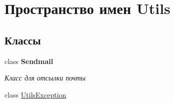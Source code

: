 \hypertarget{namespace_utils}{}\section{Пространство имен Utils}
\label{namespace_utils}
\subsection*{Классы}
\begin{DoxyCompactItemize}
\item 
class {\bfseries Sendmail}
\begin{DoxyCompactList}\small\item\em Класс для отсылки почты \end{DoxyCompactList}\item 
class \hyperlink{class_utils_1_1_utils_exception}{Utils\+Exception}
\end{DoxyCompactItemize}
